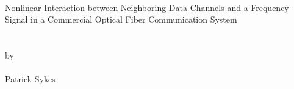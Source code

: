 \thispagestyle{empty}
\hbox{\ }
\vspace{1in}
\renewcommand{\baselinestretch}{1}
\small\normalsize
\begin{center}

\large{{Nonlinear Interaction between  Neighboring Data Channels and a Frequency Signal in a Commercial Optical Fiber Communication System}}\\
\ \\
\ \\
\large{by} \\
\ \\
\large{Patrick Sykes}%
\ \\
\ \\
\ \\
\ \\
\normalsize
\end{center}

\vspace{7.5em}
